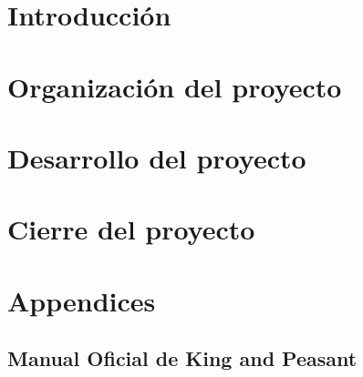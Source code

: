 \documentclass[titlepage,openright,twoside,a4paper,final,12pt,spanish]{book}
\begin{document}
\lineNumbersOn
\part{Introducción}



\part{Organización del proyecto}


%

\part{Desarrollo del proyecto}



%







\part{Cierre del proyecto}






\part{Appendices}
\appendix

\chapter{Manual Oficial de King and Peasant}
\label{anexo:reglas_juego}




\lineNumbersOff

\printglossaries
\newpage



\end{document}
